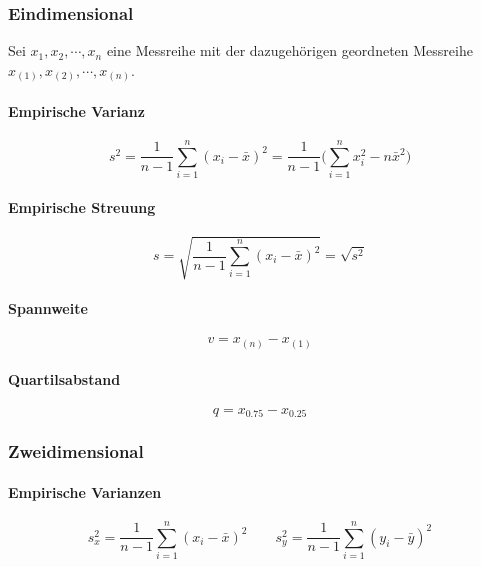             \subsubsection{Eindimensional}
                Sei \( x_1, x_2, \cdots, x_n \) eine Messreihe mit der dazugehörigen geordneten Messreihe \( x_{(1)}, x_{(2)}, \cdots, x_{(n)} \).
                
                \paragraph{Empirische Varianz}
                \begin{equation*}
                    s^2 = \frac{1}{n - 1} \sum_{i = 1}^{n} (x_i - \bar{x})^2 = \frac{1}{n - 1} \Bigg( \sum_{i = 1}^{n} x_i^2 - n \bar{x}^2 \Bigg)
                \end{equation*}
                
                \paragraph{Empirische Streuung}
                \begin{equation*}
                    s = \sqrt{\frac{1}{n - 1} \sum_{i = 1}^{n} (x_i - \bar{x})^2} = \sqrt{s^2}
                \end{equation*}
                
                \paragraph{Spannweite}
                \begin{equation*}
                    v = x_{(n)} - x_{(1)}
                \end{equation*}
                
                \paragraph{Quartilsabstand}
                \begin{equation*}
                    q = x_{0.75} - x_{0.25}
                \end{equation*}

            \subsubsection{Zweidimensional}
                \paragraph{Empirische Varianzen}
                \begin{equation*}
                    s_x^2 = \frac{1}{n - 1} \sum_{i = 1}^{n} (x_i - \bar{x})^2 \qquad s_y^2 = \frac{1}{n - 1} \sum_{i = 1}^{n} (y_i - \bar{y})^2
                \end{equation*}
                
